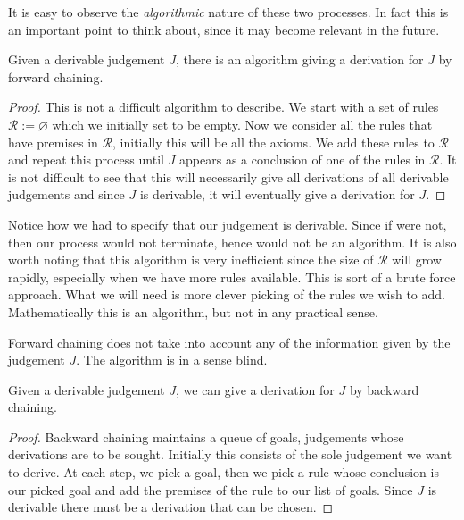 It is easy to observe the \emph{algorithmic} nature of these two processes. In fact this is an important point to think about, since it may become relevant in the future.

\begin{lemma}
    Given a derivable judgement $J$, there is an algorithm giving a derivation for $J$ by forward chaining.
\end{lemma}

\begin{proof}
    This is not a difficult algorithm to describe. We start with a set of rules $\mathcal{R} := \varnothing $ which we initially set to be empty. Now we consider all the rules that have premises in $\mathcal{R}$, initially this will be all the axioms. We add these rules to $\mathcal{R}$ and repeat this process until $J$ appears as a conclusion of one of the rules in $\mathcal{R}$. It is not difficult to see that this will necessarily give all derivations of all derivable judgements and since $J$ is derivable, it will eventually give a derivation for $J$.
\end{proof}

\begin{remark}
    Notice how we had to specify that our judgement is derivable. Since if were not, then our process would not terminate, hence would not be an algorithm. It is also worth noting that this algorithm is very inefficient since the size of $\mathcal{R}$ will grow rapidly, especially when we have more rules available. This is sort of a brute force approach. What we will need is more clever picking of the rules we wish to add. Mathematically this is an algorithm, but not in any practical sense.
\end{remark}

Forward chaining does not take into account any of the information given by the judgement $J$. The algorithm is in a sense blind. 

\begin{lemma}
    Given a derivable judgement $J$, we can give a derivation for $J$ by backward chaining.
\end{lemma}

\begin{proof}
    Backward chaining maintains a queue of goals, judgements whose derivations are to be sought. Initially this consists of the sole judgement we want to derive. At each step, we pick a goal, then we pick a rule whose conclusion is our picked goal and add the premises of the rule to our list of goals. Since $J$ is derivable there must be a derivation that can be chosen.
\end{proof}

